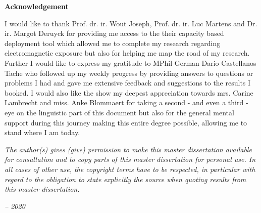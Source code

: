 \thispagestyle{empty}    %

\begin{center}
\textbf{Acknowledgement}
\end{center}

I would like to thank Prof. dr. ir. Wout Joseph, Prof. dr. ir. Luc Martens and Dr. ir. Margot Deruyck
for providing me access to the their capacity based deployment tool which allowed me to 
complete my research regarding electromagnetic exposure but  also for helping me map the road of my research.
Further I would like to express my gratitude to MPhil German Dario Castellanos Tache
who followed up my weekly progress by providing answers to  questions or problems I had and 
gave me extensive feedback and suggestions to the results I booked.
I would also like the show my deepest appreciation towards mrs. Carine Lambrecht and 
miss. Anke Blommaert for taking a second - and even a third - eye on the linguistic part of this document but also for the general 
mental support during this journey making this entire degree possible, allowing me to stand where I am today. 

\vspace*{\fill}
\emph{
The author(s) gives (give) permission to make this master dissertation available for
consultation and to copy parts of this master dissertation for personal use.
In all cases of other use, the copyright terms have to be respected, in particular with regard to
the obligation to state explicitly the source when quoting results from this master dissertation.
}
\begin{flushright}
\emph{-- 2020}
\end{flushright}